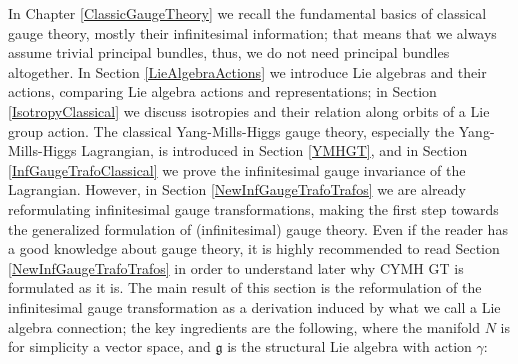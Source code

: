 In Chapter \ref{ClassicGaugeTheory} we recall the fundamental basics of classical gauge theory, mostly their infinitesimal information; that means that we always assume trivial principal bundles, thus, we do not need principal bundles altogether. In Section \ref{LieAlgebraActions} we introduce Lie algebras and their actions, comparing Lie algebra actions and representations; in Section \ref{IsotropyClassical} we discuss isotropies and their relation along orbits of a Lie group action. The classical Yang-Mills-Higgs gauge theory, especially the Yang-Mills-Higgs Lagrangian, is introduced in Section \ref{YMHGT}, and in Section \ref{InfGaugeTrafoClassical} we prove the infinitesimal gauge invariance of the Lagrangian. 
However, in Section \ref{NewInfGaugeTrafoTrafos} we are already reformulating infinitesimal gauge transformations, making the first step towards the generalized formulation of (infinitesimal) gauge theory. Even if the reader has a good knowledge about gauge theory, it is highly recommended to read Section \ref{NewInfGaugeTrafoTrafos} in order to understand later why CYMH GT is formulated as it is. The main result of this section is the reformulation of the infinitesimal gauge transformation as a derivation induced by what we call a Lie algebra connection; the key ingredients are the following, where the manifold $N$ is for simplicity a vector space, and $\mathfrak{g}$ is the structural Lie algebra with action $\gamma$:

